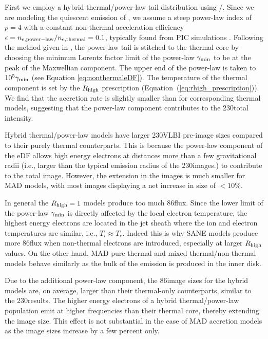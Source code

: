 First we employ a hybrid thermal/power-law tail distribution using \hamr/\bhoss.
Since we are modeling the quiescent emission of \sgra, we assume a steep power-law index of $p=4$ with a constant non-thermal acceleration efficiency $\epsilon=n_{\rm e, power-law}/n_{\rm e, thermal}=0.1$, typically found from PIC simulations \citep[e.g.,][]{Sironi2015,Crumley2019}.
Following the method given in \citet{Chatterjee2021}, the power-law tail is stitched to the thermal core by choosing the minimum Lorentz factor limit of the power-law $\gamma_{\rm min}$ to be at the peak of the Maxwellian component.
The upper end of the power-law is taken to $10^5 \gamma_{\rm min}$ (see Equation \ref{eq:nonthermaleDF}).
The temperature of the thermal component is set by the $R_\mathrm{high}$ prescription (Equation~(\ref{eq:rhigh_prescription})).
We find that the accretion rate is slightly smaller than for corresponding thermal models, suggesting that the power-law component contributes to the 230\GHz total intensity.


Hybrid thermal/power-law models have larger 230\GHz VLBI pre-image sizes compared to their purely thermal counterparts.
This is because the power-law component of the eDF allows high energy electrons at distances more than a few gravitational radii (i.e., larger than the typical emission radius of the 230\GHz images.) to contribute to the total image.
However, the extension in the images is much smaller for MAD models, with most images displaying a net increase in size of $<10\%$.


In general the $R_{\rm high}=1$ models produce too much 86\GHz flux.
Since the lower limit of the power-law $\gamma_{\rm min}$ is directly affected by the local electron temperature, the highest energy electrons are located in the jet sheath where the ion and electron temperatures are similar, i.e., $T_i\approx T_e$.
Indeed this is why SANE models produce more 86\GHz flux when non-thermal electrons are introduced, especially at larger $R_{\rm high}$ values.
On the other hand, MAD pure thermal and mixed thermal/non-thermal models behave similarly as the bulk of the emission is produced in the inner disk.

Due to the additional power-law component, the 86\GHz image sizes for the hybrid \hamr models are, on average, larger than their thermal-only counterparts, similar to the 230\GHz results.
The higher energy electrons of a hybrid thermal/power-law population emit at higher frequencies than their thermal core, thereby extending the image size.
This effect is not substantial in the case of MAD accretion models as the image sizes increase by a few percent only.

